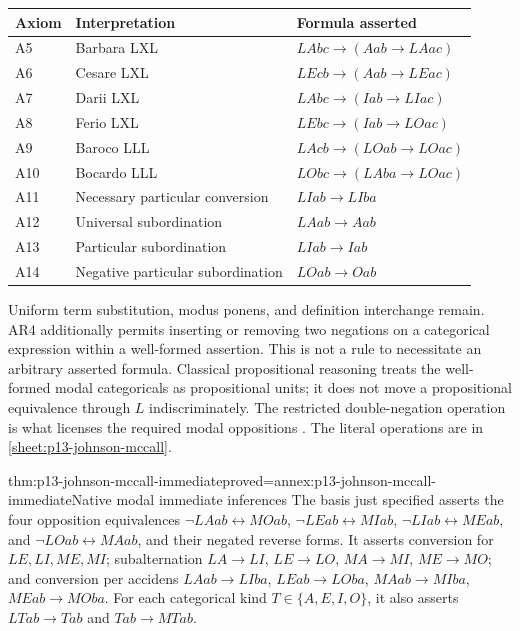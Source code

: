 \begin{tabularx}{\textwidth}{@{}l l X@{}}
\toprule
Axiom & Interpretation & Formula asserted\\
\midrule
A5 & Barbara LXL & \(LAbc\to(Aab\to LAac)\)\\
A6 & Cesare LXL & \(LEcb\to(Aab\to LEac)\)\\
A7 & Darii LXL & \(LAbc\to(Iab\to LIac)\)\\
A8 & Ferio LXL & \(LEbc\to(Iab\to LOac)\)\\
A9 & Baroco LLL & \(LAcb\to(LOab\to LOac)\)\\
A10 & Bocardo LLL & \(LObc\to(LAba\to LOac)\)\\
A11 & Necessary particular conversion & \(LIab\to LIba\)\\
A12 & Universal subordination & \(LAab\to Aab\)\\
A13 & Particular subordination & \(LIab\to Iab\)\\
A14 & Negative particular subordination & \(LOab\to Oab\)\\
\bottomrule
\end{tabularx}

Uniform term substitution, modus ponens, and definition interchange remain.
AR4 additionally permits inserting or removing two negations on a categorical
expression within a well-formed assertion. This is not a rule to necessitate
an arbitrary asserted formula. Classical propositional reasoning treats the
well-formed modal categoricals as propositional units; it does not move a
propositional equivalence through \(L\) indiscriminately. The restricted
double-negation operation is what licenses the required modal oppositions
\parencite[pp.~265--268]{Johnson2004ModalSyllogisms}.
The literal operations are in \cref{sheet:p13-johnson-mccall}.


\begin{hbtheorem}{thm:p13-johnson-mccall-immediate}{proved=annex:p13-johnson-mccall-immediate}{Native modal immediate inferences}
The basis just specified asserts the four opposition equivalences
\(\neg LAab\leftrightarrow MOab\),
\(\neg LEab\leftrightarrow MIab\),
\(\neg LIab\leftrightarrow MEab\), and
\(\neg LOab\leftrightarrow MAab\), and their negated reverse forms.
It asserts conversion for \(LE,LI,ME,MI\); subalternation
\(LA\to LI\), \(LE\to LO\), \(MA\to MI\), \(ME\to MO\);
and conversion per accidens \(LAab\to LIba\), \(LEab\to LOba\),
\(MAab\to MIba\), \(MEab\to MOba\).
For each categorical kind \(T\in\{A,E,I,O\}\), it also asserts
\(LTab\to Tab\) and \(Tab\to MTab\).
\end{hbtheorem}

